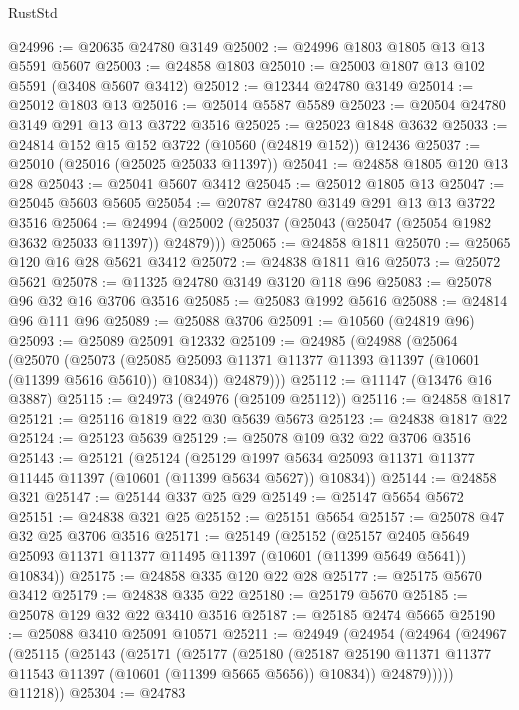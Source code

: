 \begin{lexlean}{RustStd}
\begin{coremodule}
@24996 := @20635 @24780 @3149
@25002 := @24996 @1803 @1805 @13 @13 @5591 @5607
@25003 := @24858 @1803
@25010 := @25003 @1807 @13 @102 @5591 (@3408 @5607 @3412)
@25012 := @12344 @24780 @3149
@25014 := @25012 @1803 @13
@25016 := @25014 @5587 @5589
@25023 := @20504 @24780 @3149 @291 @13 @13 @3722 @3516
@25025 := @25023 @1848 @3632
@25033 := @24814 @152 @15 @152 @3722 (@10560 (@24819 @152)) @12436
@25037 := @25010 (@25016 (@25025 @25033 @11397))
@25041 := @24858 @1805 @120 @13 @28
@25043 := @25041 @5607 @3412
@25045 := @25012 @1805 @13
@25047 := @25045 @5603 @5605
@25054 := @20787 @24780 @3149 @291 @13 @13 @3722 @3516
@25064 := @24994 (@25002 (@25037 (@25043 (@25047 (@25054 @1982 @3632 @25033 @11397)) @24879)))
@25065 := @24858 @1811
@25070 := @25065 @120 @16 @28 @5621 @3412
@25072 := @24838 @1811 @16
@25073 := @25072 @5621
@25078 := @11325 @24780 @3149 @3120 @118 @96
@25083 := @25078 @96 @32 @16 @3706 @3516
@25085 := @25083 @1992 @5616
@25088 := @24814 @96 @111 @96
@25089 := @25088 @3706
@25091 := @10560 (@24819 @96)
@25093 := @25089 @25091 @12332
@25109 := @24985
    (@24988
      (@25064
        (@25070
          (@25073 (@25085 @25093 @11371 @11377 @11393 @11397 (@10601 (@11399 @5616 @5610)) @10834))
          @24879)))
@25112 := @11147 (@13476 @16 @3887)
@25115 := @24973 (@24976 (@25109 @25112))
@25116 := @24858 @1817
@25121 := @25116 @1819 @22 @30 @5639 @5673
@25123 := @24838 @1817 @22
@25124 := @25123 @5639
@25129 := @25078 @109 @32 @22 @3706 @3516
@25143 := @25121
    (@25124
      (@25129 @1997 @5634 @25093 @11371 @11377 @11445 @11397 (@10601 (@11399 @5634 @5627)) @10834))
@25144 := @24858 @321
@25147 := @25144 @337 @25 @29
@25149 := @25147 @5654 @5672
@25151 := @24838 @321 @25
@25152 := @25151 @5654
@25157 := @25078 @47 @32 @25 @3706 @3516
@25171 := @25149
    (@25152
      (@25157 @2405 @5649 @25093 @11371 @11377 @11495 @11397 (@10601 (@11399 @5649 @5641)) @10834))
@25175 := @24858 @335 @120 @22 @28
@25177 := @25175 @5670 @3412
@25179 := @24838 @335 @22
@25180 := @25179 @5670
@25185 := @25078 @129 @32 @22 @3410 @3516
@25187 := @25185 @2474 @5665
@25190 := @25088 @3410 @25091 @10571
@25211 := @24949
    (@24954
      (@24964
        (@24967
          (@25115
            (@25143
              (@25171
                (@25177
                  (@25180
                    (@25187
                      @25190
                      @11371
                      @11377
                      @11543
                      @11397
                      (@10601 (@11399 @5665 @5656))
                      @10834))
                  @24879)))))
        @11218))
@25304 := @24783

\end{coremodule}
\end{lexlean}
